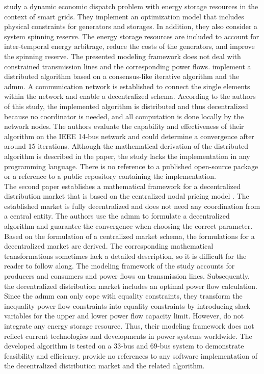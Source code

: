 \citet{xing2017} study a dynamic economic dispatch problem with energy storage resources in the context of smart grids. They implement an optimization model that includes physical constraints for generators and storages. In addition, they also consider a system spinning reserve. The energy storage resources are included to account for inter-temporal energy arbitrage, reduce the costs of the generators, and improve the spinning reserve. The presented modeling framework does not deal with constrained transmission lines and the corresponding power flows. \citet{xing2017} implement a distributed algorithm based on a consensus-like iterative algorithm and the \gls{admm}. A communication network is established to connect the single elements within the network and enable a decentralized schema. According to the authors of this study, the implemented algorithm is distributed and thus decentralized because no coordinator is needed, and all computation is done locally by the network nodes. The authors evaluate the capability and effectiveness of their algorithm on the IEEE 14-bus network and could determine a convergence after around 15 iterations. Although the mathematical derivation of the distributed algorithm is described in the paper, the study lacks the implementation in any programming language. There is no reference to a published open-source package or a reference to a public repository containing the implementation. \\

The second paper establishes a mathematical framework for a decentralized distribution market that is based on the centralized nodal pricing model \citep{yang2019}. The established market is fully decentralized and does not need any coordination from a central entity. The authors use the \gls{admm} to formulate a decentralized algorithm and guarantee the convergence when choosing the correct parameter. Based on the formulation of a centralized market schema, the formulations for a decentralized market are derived. The corresponding mathematical transformations sometimes lack a detailed description, so it is difficult for the reader to follow along. The modeling framework of the study accounts for producers and consumers and power flows on transmission lines. Subsequently, the decentralized distribution market includes an optimal power flow calculation. Since the \gls{admm} can only cope with equality constraints, they transform the inequality power flow constraints into equality constraints by introducing slack variables for the upper and lower power flow capacity limit. However, \citet{yang2019} do not integrate any energy storage resource. Thus, their modeling framework does not reflect current technologies and developments in power systems worldwide. The developed algorithm is tested on a 33-bus and 69-bus system to demonstrate feasibility and efficiency. \citet{yang2019} provide no references to any software implementation of the decentralized distribution market and the related algorithm. \\

